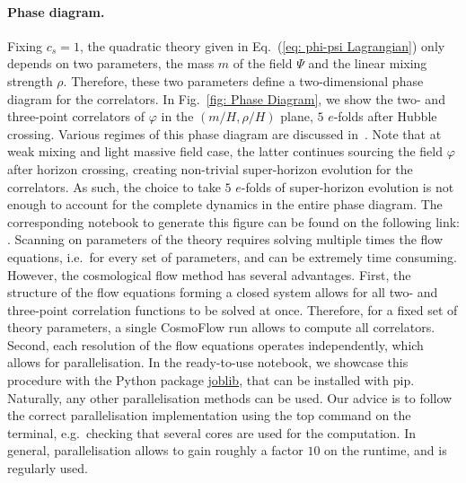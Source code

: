 \documentclass[11pt]{article}
\numberwithin{equation}{section} %
\begin{document}
\paragraph{Phase diagram.} Fixing $c_s=1$, the quadratic theory given in Eq.~(\ref{eq: phi-psi Lagrangian}) only depends on two parameters, the mass $m$ of the field $\Psi$ and the linear mixing strength $\rho$. Therefore, these two parameters define a two-dimensional phase diagram for the correlators. In Fig.~\ref{fig: Phase Diagram}, we show the two- and three-point correlators of $\varphi$ in the $(m/H, \rho/H)$ plane, $5$ $e$-folds after Hubble crossing. Various regimes of this phase diagram are discussed in~\cite{Pinol:2023oux}. Note that at weak mixing and light massive field case, the latter continues sourcing the field $\varphi$ after horizon crossing, creating non-trivial super-horizon evolution for the correlators. As such, the choice to take $5$ $e$-folds of super-horizon evolution is not enough to account for the complete dynamics in the entire phase diagram. The corresponding notebook to generate this figure can be found on the following link: \href{https://github.com/deniswerth/CosmoFlow/blob/main/CosmoFlow/PhiPsi/PhaseDiagram.ipynb}{\faGithub}. Scanning on parameters of the theory requires solving multiple times the flow equations, i.e.~for every set of parameters, and can be extremely time consuming. However, the cosmological flow method has several advantages. First, the structure of the flow equations forming a closed system allows for all two- and three-point correlation functions to be solved at once. Therefore, for a fixed set of theory parameters, a single \textsf{CosmoFlow} run allows to compute all correlators. Second, each resolution of the flow equations operates independently, which allows for parallelisation. In the ready-to-use notebook, we showcase this procedure with the Python package \href{https://joblib.readthedocs.io/en/stable/}{\textsf{joblib}}, that can be installed with \textsf{pip}. Naturally, any other parallelisation methods can be used. Our advice is to follow the correct parallelisation implementation using the \textsf{top} command on the terminal, e.g.~checking that several cores are used for the computation. In general, parallelisation allows to gain roughly a factor $10$ on the runtime, and is regularly used. 
\end{document}
